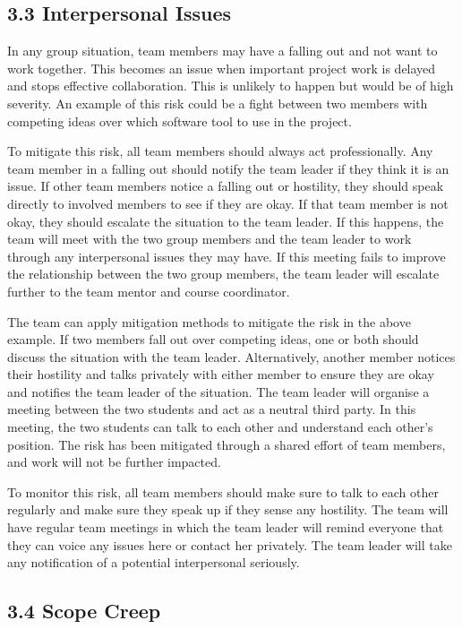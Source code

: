 \subsection*{3.3 Interpersonal Issues}

In any group situation, team members may have a falling out and not want to work together. This becomes an issue when important project work is delayed and stops effective collaboration. This is unlikely to happen but would be of high severity. An example of this risk could be a fight between two members with competing ideas over which software tool to use in the project. 

To mitigate this risk, all team members should always act professionally. Any team member in a falling out should notify the team leader if they think it is an issue. If other team members notice a falling out or hostility, they should speak directly to involved members to see if they are okay. If that team member is not okay, they should escalate the situation to the team leader. If this happens, the team will meet with the two group members and the team leader to work through any interpersonal issues they may have. If this meeting fails to improve the relationship between the two group members, the team leader will escalate further to the team mentor and course coordinator. 

The team can apply mitigation methods to mitigate the risk in the above example. If two members fall out over competing ideas, one or both should discuss the situation with the team leader. Alternatively, another member notices their hostility and talks privately with either member to ensure they are okay and notifies the team leader of the situation. The team leader will organise a meeting between the two students and act as a neutral third party. In this meeting, the two students can talk to each other and understand each other's position. The risk has been mitigated through a shared effort of team members, and work will not be further impacted. 

To monitor this risk, all team members should make sure to talk to each other regularly and make sure they speak up if they sense any hostility. The team will have regular team meetings in which the team leader will remind everyone that they can voice any issues here or contact her privately. The team leader will take any notification of a potential interpersonal seriously. 

\subsection*{3.4 Scope Creep}

